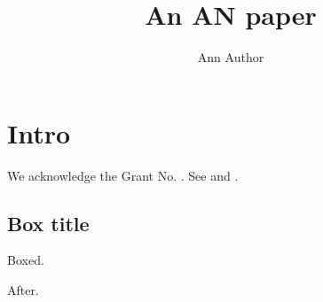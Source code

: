 \documentclass[STIX1COL]{WileyASNA-v1}
\begin{document}
\title{An AN paper}
\author[1]{Ann Author}
\address[1]{}
\maketitle
\section{Intro}
We acknowledge the  Grant No. .
See \aaa{} and \apj.
\begin{boxtext}
\section*{Box title}
Boxed.
\end{boxtext}
After.
\end{document}
